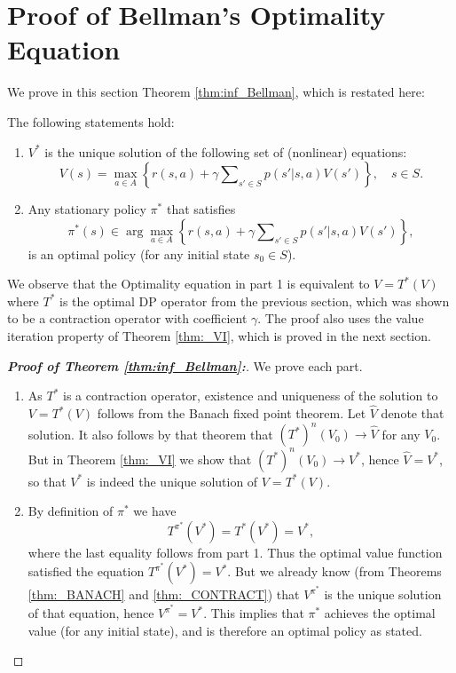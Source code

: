 \section{Proof of Bellman's Optimality Equation}
We prove in this section Theorem \ref{thm:inf_Bellman}, which is restated here:
\begin{theorem*}
The following statements hold:
\begin{enumerate}
  \item $V_{}^*$ is the unique solution of the following set of (nonlinear) equations:
\begin{equation}\label{eq:Bellman2}
V(s) = \mathop {\max }\limits_{a \in A} \left\{ {r(s,a) + \gamma \sum\nolimits_{s' \in S} {p(s'|s,a)V(s')} } \right\},     \quad s \in S.
\end{equation}
  \item Any stationary policy ${\pi ^*}$ that satisfies
\[{\pi ^*}(s) \in \arg {\max _{a \in A}}\left\{ {r(s,a) + \gamma \sum\nolimits_{s' \in S} {p(s'|s,a)V(s')} } \right\},\]
     is an optimal policy (for any initial state ${s_0} \in S$).
\end{enumerate}
\end{theorem*}
We observe that the Optimality equation in part 1 is equivalent to
$V = {T^*}(V)$
where ${T^*}$ is the optimal DP operator from the previous section, which was shown to be a contraction operator with coefficient $\gamma $.  The proof also uses the value iteration property of Theorem \ref{thm:_VI}, which is proved in the next section.

\begin{proof}[\textbf{Proof of Theorem \ref{thm:inf_Bellman}:}]
We prove each part.
\begin{enumerate}
  \item As $T_{}^*$ is a contraction operator, existence and uniqueness of the solution to $V = T_{}^*(V)$ follows from the Banach fixed point theorem. Let $\hat V$ denote that solution. It also follows by that theorem that ${(T_{}^*)^n}({V_0}) \to \hat V$ for any ${V_0}$. But in Theorem \ref{thm:_VI} we show that ${(T_{}^*)^n}({V_0}) \to V_{}^*$, hence $\hat V = V_{}^*$,  so that $V_{}^*$ is indeed the unique solution of  $V = T_{}^*(V)$.
  \item By definition of  ${\pi ^*}$ we have
\[T_{}^{\pi ^*}(V_{}^*) = T_{}^*(V_{}^*) = V_{}^*,\]
where the last equality follows from part 1. Thus the optimal value function satisfied the equation $T_{}^{\pi ^*}(V_{}^*) = V_{}^*$. But we already know (from Theorems \ref{thm:_BANACH} and \ref{thm:_CONTRACT}) that $V_{}^{\pi ^*}$ is the unique solution of that equation, hence $V_{}^{\pi ^*} = V_{}^*$. This implies that ${\pi ^*}$ achieves the optimal value (for any initial state), and is therefore an optimal policy as stated.
\end{enumerate}
\end{proof}

